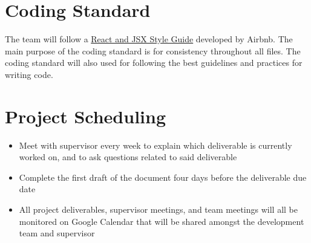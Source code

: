 \documentclass{article}
\begin{document}
\section{Coding Standard}
The team will follow a \href{https://airbnb.io/javascript/react/}{React and JSX Style Guide} developed by Airbnb. The main purpose of the coding standard is for consistency throughout all files. The coding standard will also used for following the best guidelines and practices for writing code.


\section{Project Scheduling}


    \begin{itemize}
        \item Meet with supervisor every week to explain which deliverable is currently worked on, and to ask questions related to said deliverable
        \item Complete the first draft of the document four days before the deliverable due date
        \item All project deliverables, supervisor meetings, and team meetings will all be monitored on Google Calendar that will be shared amongst the development team and supervisor
    \end{itemize}
\end{document}
